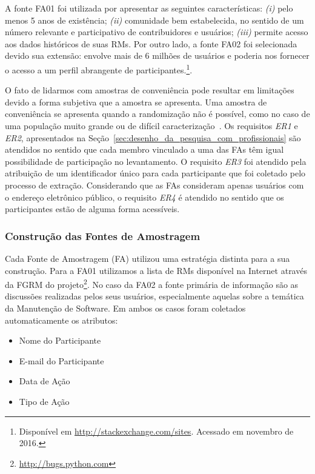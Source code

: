 A fonte FA01 foi utilizada por apresentar as seguintes características:
\textit{(i)} pelo menos 5 anos de existência; \textit{(ii)} comunidade bem
estabelecida, no sentido de um número relevante e participativo de
contribuidores e usuários; \textit{(iii)} permite acesso aos dados históricos
de suas RMs. Por outro lado, a fonte FA02 foi selecionada devido sua extensão:
envolve mais de 6 milhões de usuários e poderia nos fornecer o acesso a um
perfil abrangente de participantes.\footnote{Disponível em
    \url{http://stackexchange.com/sites}. Acessado em novembro de 2016.}.

O fato de lidarmos com amostras de conveniência pode resultar em limitações
devido a forma subjetiva que a amostra se apresenta. Uma amostra de
conveniência se apresenta quando a randomização não é possível, como no
caso de uma população muito grande ou de difícil
caracterização~\cite{boxill1997introduction}. Os requisitos \textit{ER1} e
\textit{ER2}, apresentados na
Seção~\ref{sec:desenho_da_pesquisa_com_profissionais} são atendidos no sentido
que cada membro vinculado a uma das FAs têm igual possibilidade de
participação no levantamento. O requisito \textit{ER3} foi atendido pela
atribuição de um identificador único para cada participante que foi coletado
pelo processo de extração. Considerando que as FAs consideram apenas usuários
com o endereço eletrônico público, o requisito \textit{ER4} é atendido no
sentido que os participantes estão de alguma forma acessíveis.

\subsubsection{Construção das Fontes de Amostragem}\label{subsubsec:construcao_fonte_amostragem}

Cada Fonte de Amostragem (FA) utilizou uma estratégia distinta para a sua
construção. Para a FA01 utilizamos a lista de RMs disponível na Internet através
da FGRM do projeto\footnote{\url{http://bugs.python.com}}. No caso da FA02 a
fonte primária de informação são as discussões realizadas pelos seus usuários,
especialmente aquelas sobre a temática da Manutenção de Software. Em ambos os
casos foram coletados automaticamente os atributos:

\begin{itemize}
	\item Nome do Participante
	\item E-mail do Participante
	\item Data de Ação
	\item Tipo de Ação
\end{itemize}

